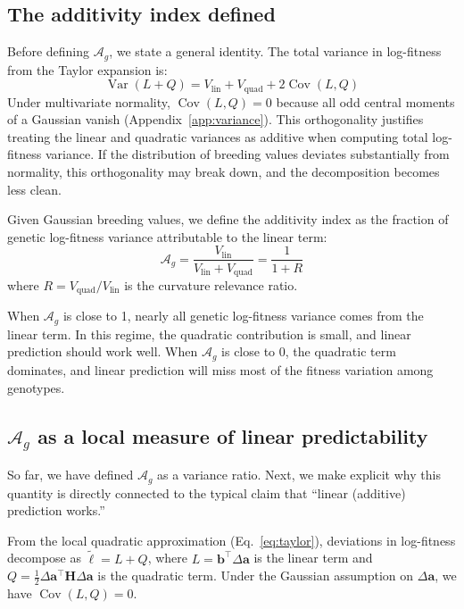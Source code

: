 \documentclass[9pt,twocolumn,twoside,lineno]{gsajnl}
\newcommand{\vect}[1]{\boldsymbol{#1}}
\newcommand{\mat}[1]{\mathbf{#1}}
\newcommand{\Ag}{\ensuremath{\mathcal{A}_{g}}\xspace}
\newcommand{\Vlin}{\ensuremath{V_{\text{lin}}}\xspace}
\newcommand{\Vquad}{\ensuremath{V_{\text{quad}}}\xspace}
\newcommand{\Var}{\ensuremath{\operatorname{Var}}\xspace}
\newcommand{\Cov}{\ensuremath{\operatorname{Cov}}\xspace}
\begin{document}
\subsection{The additivity index defined}

Before defining \Ag, we state a general identity. The total variance in log-fitness from the Taylor expansion is:
\begin{equation}
\Var(L + Q) = \Vlin + \Vquad + 2\Cov(L, Q)
\label{eq:total-var}
\end{equation}
Under multivariate normality, $\Cov(L, Q) = 0$ because all odd central moments of a Gaussian vanish (Appendix~\ref{app:variance}). This orthogonality justifies treating the linear and quadratic variances as additive when computing total log-fitness variance. If the distribution of breeding values deviates substantially from normality, this orthogonality may break down, and the decomposition becomes less clean.

Given Gaussian breeding values, we define the additivity index as the fraction of genetic log-fitness variance attributable to the linear term:
\begin{equation}
\Ag = \frac{\Vlin}{\Vlin + \Vquad} = \frac{1}{1 + R}
\label{eq:Ag}
\end{equation}
where $R = \Vquad/\Vlin$ is the curvature relevance ratio.

When $\Ag$ is close to 1, nearly all genetic log-fitness variance comes from the linear term. In this regime, the quadratic contribution is small, and linear prediction should work well. When $\Ag$ is close to 0, the quadratic term dominates, and linear prediction will miss most of the fitness variation among genotypes.

\subsection{\Ag as a local measure of linear predictability}
\label{sec:Ag_predictability}

So far, we have defined \Ag as a variance ratio. Next, we make explicit why this quantity is directly connected to the typical claim that ``linear (additive) prediction works.''

From the local quadratic approximation (Eq.~\eqref{eq:taylor}), deviations in log-fitness decompose as
$\tilde{\ell}=L+Q$, where $L=\vect{b}^\top\Delta\vect{a}$ is the linear term and $Q = \tfrac{1}{2}\Delta\vect{a}^\top \mat{H} \Delta\vect{a}$ is the quadratic term. Under the Gaussian assumption on $\Delta\vect{a}$, we have $\Cov(L,Q) = 0$.
\end{document}
